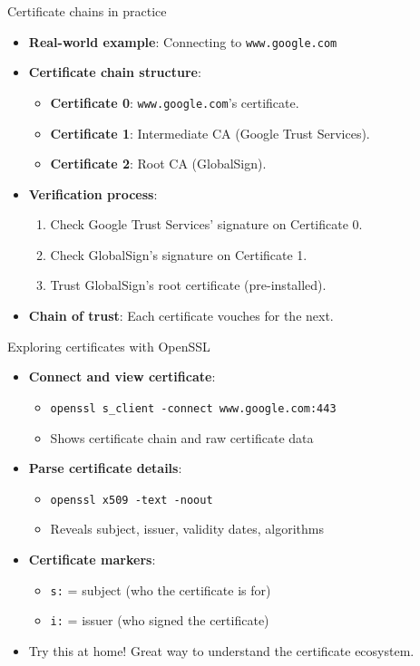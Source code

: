 \ifdefined\PRESENTATION\else\PassOptionsToClass{handout}{beamer}\fi\documentclass[aspectratio=169, lualatex]{beamer}
\begin{document}
\begin{frame}{Certificate chains in practice}
	\begin{itemize}[<+->]
		\item \textbf{Real-world example}: Connecting to \texttt{www.google.com}
		\item \textbf{Certificate chain structure}:
		      \begin{itemize}
			      \item \textbf{Certificate 0}: \texttt{www.google.com}'s certificate.
			      \item \textbf{Certificate 1}: Intermediate CA (Google Trust Services).
			      \item \textbf{Certificate 2}: Root CA (GlobalSign).
		      \end{itemize}
		\item \textbf{Verification process}:
		      \begin{enumerate}
			      \item Check Google Trust Services' signature on Certificate 0.
			      \item Check GlobalSign's signature on Certificate 1.
			      \item Trust GlobalSign's root certificate (pre-installed).
		      \end{enumerate}
		\item \textbf{Chain of trust}: Each certificate vouches for the next.
	\end{itemize}
\end{frame}

\begin{frame}{Exploring certificates with OpenSSL}
	\begin{itemize}[<+->]
		\item \textbf{Connect and view certificate}:
		      \begin{itemize}
			      \item \texttt{openssl s\_client -connect www.google.com:443}
			      \item Shows certificate chain and raw certificate data
		      \end{itemize}
		\item \textbf{Parse certificate details}:
		      \begin{itemize}
			      \item \texttt{openssl x509 -text -noout}
			      \item Reveals subject, issuer, validity dates, algorithms
		      \end{itemize}
		\item \textbf{Certificate markers}:
		      \begin{itemize}
			      \item \texttt{s:} = subject (who the certificate is for)
			      \item \texttt{i:} = issuer (who signed the certificate)
		      \end{itemize}
		\item Try this at home! Great way to understand the certificate ecosystem.
	\end{itemize}
\end{frame}
\end{document}
